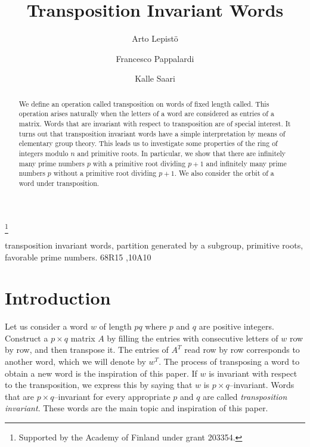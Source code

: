 \documentclass{elsart}
\begin{document}
\begin{frontmatter}


\title{Transposition Invariant Words}

\author[arto]{Arto Lepist\"o}
\author[francesco]{Francesco Pappalardi}
\author[kalle]{Kalle Saari}
\thanks{Supported by the Academy of Finland under grant 203354.}

\address[arto]{Department of Mathematics \\University of Turku \\20014 Turku, Finland}

\address[francesco]{Dipartimento di Matematica \\ Universita` degli studi Roma TRE \\ Largo S. L. Murialdo, 1 \\ I-00146, Rome - Italy}

\address[kalle]{Department of Mathematics and Turku Centre for Computer Science\\University of Turku \\20014 Turku, Finland}

\begin{abstract}
We define an operation called transposition on words of fixed length called.
This operation arises naturally when the letters of
a word are considered as entries of a matrix. Words that are
invariant with respect to transposition are of special interest.
It turns out that transposition invariant words have
a simple interpretation by means of elementary group theory.
This leads us to investigate some properties of the ring of integers modulo $n$ and primitive roots.
In particular, we show that there are infinitely many prime numbers $p$ with a primitive root dividing $p+1$ and
infinitely many prime numbers $p$ without a primitive root dividing $p+1$.
We also consider the orbit of a word under transposition.

\end{abstract}
\begin{keyword}
transposition invariant words, partition generated by a
 subgroup, primitive roots, favorable prime numbers.
 \MSC 68R15 \sep \MSC 10A10
\end{keyword}
\end{frontmatter}

\section{Introduction}
Let us consider a word $w$ of length $pq$ where $p$ and $q$ are positive integers. Construct a $p\times q$ matrix $A$ by filling the entries with
consecutive letters of $w$ row by row, and then transpose it. The entries of $A^T$ read row by row corresponds to another word, which we will denote by
 $w^T$. The process of transposing a word to obtain a new word is the inspiration of this paper. If $w$ is invariant with respect to the transposition, we express this by saying that $w$ is $p\times q$--invariant. Words that are $p\times q$--invariant
for every appropriate $p$ and $q$ are called \emph{transposition invariant}. These words are the main topic and inspiration of this paper.
\end{document}
